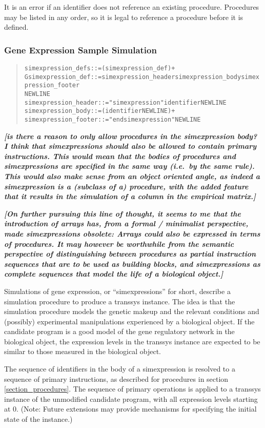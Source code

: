 \documentclass[a4paper,fleqn]{article}
\newcommand{\todo}[1]{\rule{0pt}{0pt}\marginpar{\rule{1ex}{1ex}}\textbf{\emph{[#1]}}}
\newenvironment{ebnfrule}{\begin{footnotesize}\begin{quote}\begin{alltt}}{\end{alltt}\end{quote}\end{footnotesize}}
\begin{document}
It is an error if an identifier does not reference an existing
procedure. Procedures may be listed in any order, so it is legal to
reference a procedure before it is defined.


\subsubsection{Gene Expression Sample Simulation}

\begin{ebnfrule}
simexpression_defs ::= (simexpression_def)+
Gsimexpression_def ::= simexpression_header simexpression_body simexpression_footer 
NEWLINE
simexpression_header ::= "simexpression" identifier NEWLINE
simexpression_body ::= (identifier NEWLINE)+
simexpression_footer ::= "endsimexpression" NEWLINE
\end{ebnfrule}

\todo{is there a reason to only allow procedures in the simexpression
  body? I think that simexpressions should also be allowed to contain
  primary instructions. This would mean that the bodies of procedures
  and simexpressions are specified in the same way (i.e.\ by the same
  rule). This would also make sense from an object oriented angle, as
  indeed a simexpression \emph{is a} (subclass of a) procedure, with
  the added feature that it results in the simulation of a column in
  the empirical matrix.}

\todo{On further pursuing this line of thought, it seems to me that
  the introduction of arrays has, from a formal / minimalist
  perspective, made simexpressions obsolete: Arrays could also be
  expressed in terms of procedures. It may however be worthwhile from
  the semantic perspective of distinguishing between procedures as
  partial instruction sequences that are to be used as building
  blocks, and simexpressions as complete sequences that model the life
  of a biological object.}

Simulations of gene expression, or ``simexpressions'' for short,
describe a simulation procedure to produce a transsys instance. The
idea is that the simulation procedure models the genetic makeup and
the relevant conditions and (possibly) experimental manipulations
experienced by a biological object. If the candidate program is a good
model of the gene regulatory network in the biological object, the
expression levels in the transsys instance are expected to be similar
to those measured in the biological object.

The sequence of identifiers in the body of a simexpression is resolved
to a sequence of primary instructions, as described for procedures in
section \ref{section_procedures}. The sequence of primary operations
is applied to a transsys instance of the unmodified candidate program,
with all expression levels starting at $0$. (Note: Future extensions
may provide mechanisms for specifying the initial state of the instance.)
\end{document}
